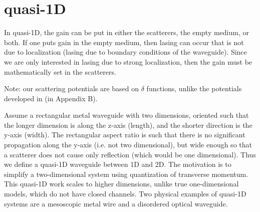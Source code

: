 \section{quasi-1D}

\begin{comment}
 Outline:

Closed channels, renormalization of conductance *******************
0. Introduction
    a. motivation: why are closed channels important
    b. neglect them
1. Method
    a. numerical simulation model description
        i. generate random scatterer positions
        ii. free space and scatterer matrices multiplied
        iii. self-embedding technique
2. simulation results
    a. for N_c=0, model matches theory
    b. add N_c, there is a deviation in g.
        i. dependence on alpha, density
    c. with scaling, the N_c can be renormalized to N_c=0
        i. recovers lack of dependence on alpha, density
3. why it works
    a. folding technique description
        i. single scatterer
            -eliminate closed channels by matrix element renormalization
        ii. double scatterer
            -adds separation ("density") scaling
    b. supports conclusion on scattering strength alpha, density
4. conclusion
    a. review of main points
       -you can disregard N_c, as long as you do it correctly

Regimes plot development **********************
lengths
boundaries
explanation of regimes, characteristic behavior

Criterion for AL in active random media *****************
various passive criteria comparison


\end{comment}

In quasi-1D, the gain can be put in either the scatterers, the empty medium, or both. If one puts gain in the empty medium, then lasing can occur that is not due to localization (lasing due to boundary conditions of the waveguide). Since we are only interested in lasing due to strong localization, then the gain must be mathematically set in the scatterers. 


Note: our scattering potentials are based on $\delta$ functions, unlike the potentials developed in \cite{2007_Froufe-Perez_PRE} (in Appendix B).


Assume a rectangular metal waveguide with two dimensions, oriented such that the longer dimension is along the z-axis (length), and the shorter direction is the y-axis (width). The rectangular aspect ratio is such that there is no significant propagation along the y-axis (i.e. not two dimensional), but wide enough so that a scatterer does not cause only reflection (which would be one dimensional). Thus we define a quasi-1D waveguide between 1D and 2D. The motivation is to simplify a two-dimensional system using quantization of transverse momentum. This quasi-1D work scales to higher dimensions, unlike true one-dimensional models, which do not have closed channels. Two physical examples of quasi-1D systems are a mesoscopic metal wire and a disordered optical waveguide.

